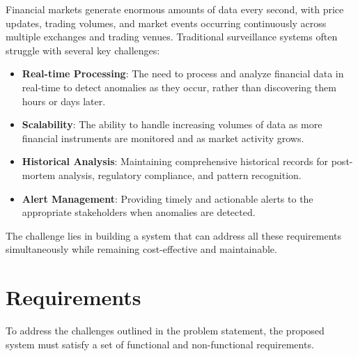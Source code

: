 Financial markets generate enormous amounts of data every second, with price updates, trading volumes, and market events occurring continuously across multiple exchanges and trading venues. Traditional surveillance systems often struggle with several key challenges:
% 
\begin{itemize}
    \item \textbf{Real-time Processing}: The need to process and analyze financial data in real-time to detect anomalies as they occur, rather than discovering them hours or days later.
    
    \item \textbf{Scalability}: The ability to handle increasing volumes of data as more financial instruments are monitored and as market activity grows.
        
    \item \textbf{Historical Analysis}: Maintaining comprehensive historical records for post-mortem analysis, regulatory compliance, and pattern recognition.
    
    \item \textbf{Alert Management}: Providing timely and actionable alerts to the appropriate stakeholders when anomalies are detected.
\end{itemize}

The challenge lies in building a system that can address all these requirements simultaneously while remaining cost-effective and maintainable.
\section{Requirements}

To address the challenges outlined in the problem statement, the proposed system must satisfy a set of functional and non-functional requirements.


